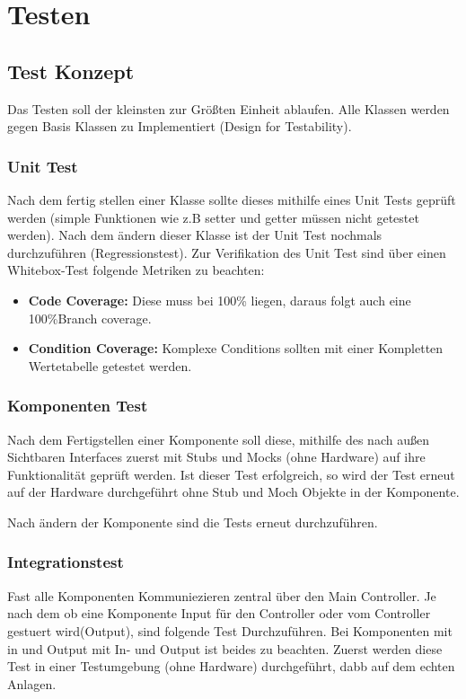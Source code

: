 \chapter{Testen}

\section{Test Konzept}
Das Testen soll der kleinsten zur Größten Einheit ablaufen.
Alle Klassen werden gegen Basis Klassen zu Implementiert (Design for Testability).

\subsection{Unit Test}
Nach dem fertig stellen einer Klasse sollte dieses mithilfe eines Unit Tests geprüft werden (simple Funktionen wie z.B setter und getter müssen nicht getestet werden).
Nach dem ändern dieser Klasse ist der Unit Test nochmals durchzuführen (Regressionstest).
Zur Verifikation des Unit Test sind über einen Whitebox-Test folgende Metriken zu beachten:
\begin{itemize} 
	\item \textbf{Code Coverage:} Diese muss bei 100\% liegen, daraus folgt auch eine 100\%Branch coverage.
	\item\textbf{Condition Coverage:} Komplexe Conditions sollten mit einer Kompletten Wertetabelle getestet werden.
\end{itemize}

\subsection{Komponenten Test}
Nach dem Fertigstellen einer Komponente soll diese, mithilfe des nach außen Sichtbaren Interfaces zuerst mit Stubs und Mocks (ohne Hardware) auf ihre Funktionalität geprüft werden.
Ist dieser Test erfolgreich, so wird der Test erneut auf der Hardware durchgeführt ohne Stub und Moch Objekte in der Komponente. 

Nach ändern der Komponente sind die Tests erneut durchzuführen.

\subsection{Integrationstest}
Fast alle Komponenten Kommuniezieren zentral über den Main Controller.
Je nach dem ob eine Komponente Input für den Controller oder vom Controller gestuert wird(Output), sind folgende Test Durchzuführen.
Bei Komponenten mit in und Output mit In- und Output ist beides zu beachten. Zuerst werden diese Test in einer Testumgebung (ohne Hardware) durchgeführt, 
dabb auf dem echten Anlagen.

